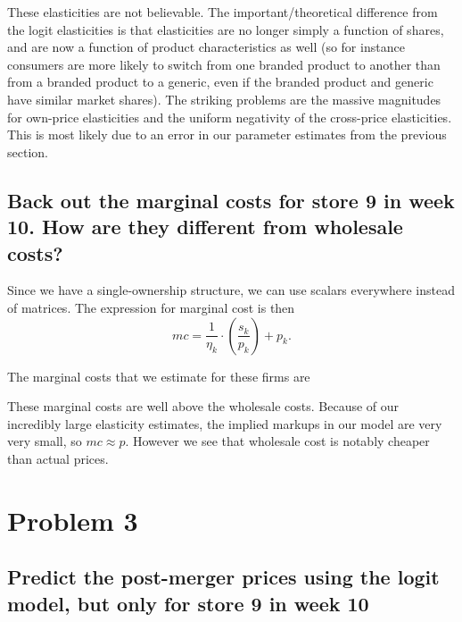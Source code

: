 \documentclass[dvipsnames]{article}
\begin{document}
\begin{table}[htp]
  \centering
    
\end{table}

These elasticities are not believable. The important/theoretical difference from the logit elasticities is that elasticities are no longer simply a function of shares, and are now a function of product characteristics as well (so for instance consumers are more likely to switch from one branded product to another than from a branded product to a generic, even if the branded product and generic have similar market shares). The striking problems are the massive magnitudes for own-price elasticities and the uniform negativity of the cross-price elasticities. This is most likely due to an error in our parameter estimates from the previous section.

\subsection*{Back out the marginal costs for store 9 in week 10. How are they different from wholesale costs?}

Since we have a single-ownership structure, we can use scalars everywhere instead of matrices. The expression for marginal cost is then
\[
mc = \frac{1}{\eta_k} \cdot \left(\frac{s_k}{p_k}\right) + p_k.
\]

The marginal costs that we estimate for these firms are
\begin{table}[htp]
  \centering
  
\end{table}

These marginal costs are well above the wholesale costs. Because of our incredibly large elasticity estimates, the implied markups in our model are very very small, so $mc \approx p$. However we see that wholesale cost is notably cheaper than actual prices.

\newpage
\section*{Problem 3}
\subsection*{Predict the post-merger prices using the logit model, but only for store 9 in week 10}

\begin{table}[htp]
  \centering
  
\end{table}
\end{document}
